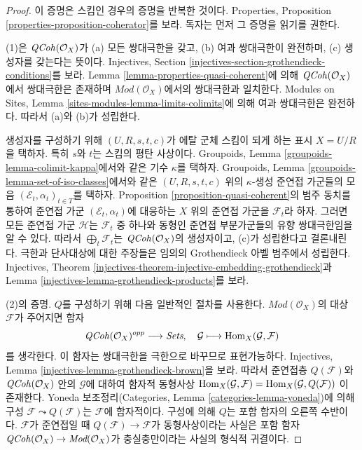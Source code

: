 \begin{proof}
이 증명은 스킴인 경우의 증명을 반복한 것이다. Properties, Proposition
\ref{properties-proposition-coherator}를 보라. 독자는 먼저 그 증명을
읽기를 권한다.

\medskip\noindent
(1)은 $\mathit{QCoh}(\mathcal{O}_X)$가 (a) 모든 쌍대극한을 갖고, (b) 여과
쌍대극한이 완전하며, (c) 생성자를 갖는다는 뜻이다. Injectives, Section
\ref{injectives-section-grothendieck-conditions}를 보라. Lemma
\ref{lemma-properties-quasi-coherent}에 의해 $\mathit{QCoh}(\mathcal{O}_X)$에서
쌍대극한은 존재하며 $\textit{Mod}(\mathcal{O}_X)$에서의 쌍대극한과
일치한다. Modules on Sites, Lemma
\ref{sites-modules-lemma-limits-colimits}에 의해 여과 쌍대극한은 완전하다.
따라서 (a)와 (b)가 성립한다.

\medskip\noindent
생성자를 구성하기 위해 $(U, R, s, t, c)$가 에탈 군체 스킴이 되게 하는
표시 $X = U/R$을 택하자. 특히 $s$와 $t$는 스킴의 평탄 사상이다.
Groupoids, Lemma \ref{groupoids-lemma-colimit-kappa}에서와 같은 기수
$\kappa$를 택하자. Groupoids, Lemma
\ref{groupoids-lemma-set-of-iso-classes}에서와 같은
$(U, R, s, t, c)$ 위의 $\kappa$-생성 준연접 가군들의 모음
$(\mathcal{E}_t, \alpha_t)_{t \in T}$를 택하자. Proposition
\ref{proposition-quasi-coherent}의 범주 동치를 통하여 준연접 가군
$(\mathcal{E}_t, \alpha_t)$에 대응하는 $X$ 위의 준연접 가군을
$\mathcal{F}_t$라 하자. 그러면 모든 준연접 가군 $\mathcal{H}$는
$\mathcal{F}_t$ 중 하나와 동형인 준연접 부분가군들의 유향 쌍대극한임을
알 수 있다. 따라서 $\bigoplus_t \mathcal{F}_t$는
$\mathit{QCoh}(\mathcal{O}_X)$의 생성자이고, (c)가 성립한다고 결론내린다.
극한과 단사대상에 대한 주장들은 임의의 Grothendieck 아벨 범주에서
성립한다. Injectives, Theorem
\ref{injectives-theorem-injective-embedding-grothendieck}과 Lemma
\ref{injectives-lemma-grothendieck-products}를 보라.

\medskip\noindent
(2)의 증명. $Q$를 구성하기 위해 다음 일반적인 절차를 사용한다.
$\textit{Mod}(\mathcal{O}_X)$의 대상 $\mathcal{F}$가 주어지면 함자
$$
\mathit{QCoh}(\mathcal{O}_X)^{opp} \longrightarrow \textit{Sets},\quad
\mathcal{G} \longmapsto \mathop{\mathrm{Hom}}\nolimits_X(\mathcal{G}, \mathcal{F})
$$
를 생각한다. 이 함자는 쌍대극한을 극한으로 바꾸므로 표현가능하다.
Injectives, Lemma \ref{injectives-lemma-grothendieck-brown}을 보라.
따라서 준연접층 $Q(\mathcal{F})$와 $\mathit{QCoh}(\mathcal{O}_X)$ 안의
$\mathcal{G}$에 대하여 함자적 동형사상
$\mathop{\mathrm{Hom}}\nolimits_X(\mathcal{G}, \mathcal{F}) = \mathop{\mathrm{Hom}}\nolimits_X(\mathcal{G}, Q(\mathcal{F}))$
이 존재한다. Yoneda 보조정리(Categories, Lemma
\ref{categories-lemma-yoneda})에 의해 구성
$\mathcal{F} \leadsto Q(\mathcal{F})$는 $\mathcal{F}$에 함자적이다.
구성에 의해 $Q$는 포함 함자의 오른쪽 수반이다. $\mathcal{F}$가 준연접일
때 $Q(\mathcal{F}) \to \mathcal{F}$가 동형사상이라는 사실은 포함 함자
$\mathit{QCoh}(\mathcal{O}_X) \to \textit{Mod}(\mathcal{O}_X)$가 충실충만이라는
사실의 형식적 귀결이다.
\end{proof}






